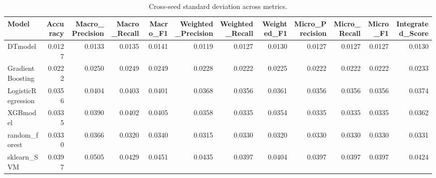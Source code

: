 \begin{table}[t]
\centering
\begin{tabular}{lrrrrrrrrrrr}
\toprule
Model & Accuracy & Macro_Precision & Macro_Recall & Macro_F1 & Weighted_Precision & Weighted_Recall & Weighted_F1 & Micro_Precision & Micro_Recall & Micro_F1 & Integrated_Score \\
\midrule
DTmodel & 0.0127 & 0.0133 & 0.0135 & 0.0141 & 0.0119 & 0.0127 & 0.0130 & 0.0127 & 0.0127 & 0.0127 & 0.0130 \\
GradientBoosting & 0.0222 & 0.0250 & 0.0249 & 0.0249 & 0.0228 & 0.0222 & 0.0225 & 0.0222 & 0.0222 & 0.0222 & 0.0233 \\
LogisticRegression & 0.0356 & 0.0404 & 0.0403 & 0.0401 & 0.0368 & 0.0356 & 0.0361 & 0.0356 & 0.0356 & 0.0356 & 0.0374 \\
XGBmodel & 0.0335 & 0.0390 & 0.0402 & 0.0405 & 0.0358 & 0.0335 & 0.0354 & 0.0335 & 0.0335 & 0.0335 & 0.0362 \\
random_forest & 0.0330 & 0.0366 & 0.0320 & 0.0340 & 0.0315 & 0.0330 & 0.0320 & 0.0330 & 0.0330 & 0.0330 & 0.0331 \\
sklearn_SVM & 0.0397 & 0.0505 & 0.0429 & 0.0451 & 0.0435 & 0.0397 & 0.0404 & 0.0397 & 0.0397 & 0.0397 & 0.0424 \\
\bottomrule
\end{tabular}
\caption{Cross-seed standard deviation across metrics.}
\label{tab:cross_seed_std}
\end{table}